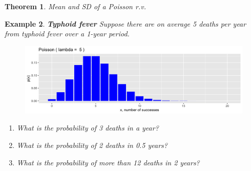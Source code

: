 \documentclass[12pt]{amsart}
\newtheorem{theorem}{Theorem}[section]
\newtheorem{example}[theorem]{Example}
\newcommand{\bP}{\mathbb{P}}
\begin{document}
{\begin{theorem}{Mean and SD of a Poisson r.v.}
\vspace{1cm}


\end{theorem}

\newpage
\begin{example}  \textbf{Typhoid fever} \newline
Suppose there are on average 5 deaths per year from typhoid fever over a 1-year period. 

\begin{figure}[h!]
  \includegraphics[width=5in]{img/Poisson_L5.png}
\end{figure}


\begin{enumerate}
\item What is the probability of 3 deaths in a year?


\vfill
\item What is the probability of 2 deaths in 0.5 years?


\vfill

\item What is the probability of more than 12 deaths in 2 years?



\end{enumerate}
\end{example}}
\end{document}
